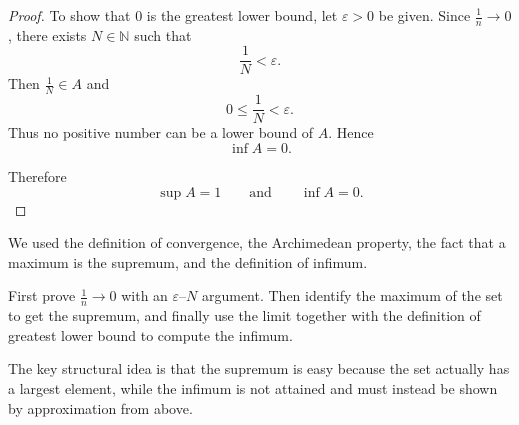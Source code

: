\begin{generatedexerciseconstruction}
\begin{proof}
To show that \(0\) is the greatest lower bound, let \(\varepsilon>0\) be given.
Since \(\frac1n\to 0\), there exists \(N\in\mathbb{N}\) such that
\[
\frac1N<\varepsilon.
\]
Then \(\frac1N\in A\) and
\[
0\le \frac1N < \varepsilon.
\]
Thus no positive number can be a lower bound of \(A\). Hence
\[
\inf A = 0.
\]

Therefore
\[
\sup A = 1
\qquad\text{and}\qquad
\inf A = 0.
\]
\end{proof}

\begin{remark*}[Dependencies]
We used the definition of convergence, the Archimedean property,
the fact that a maximum is the supremum, and the definition of infimum.
\end{remark*}

\begin{remark*}
First prove \(\frac1n\to 0\) with an \(\varepsilon\)–\(N\) argument. Then identify
the maximum of the set to get the supremum, and finally use the limit together
with the definition of greatest lower bound to compute the infimum.
\end{remark*}

\begin{remark*}[Reflection]
The key structural idea is that the supremum is easy because the set actually
has a largest element, while the infimum is not attained and must instead be
shown by approximation from above.
\end{remark*}

\end{generatedexerciseconstruction}

